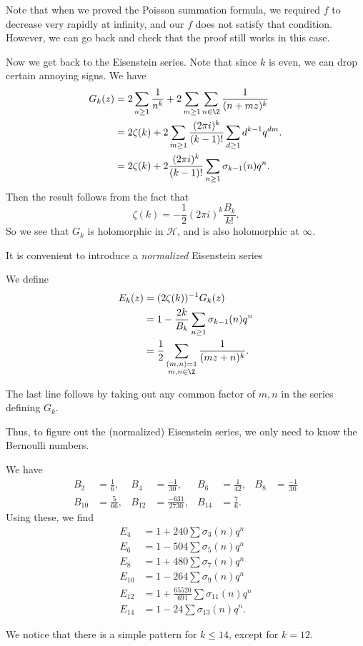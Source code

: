 \documentclass[a4paper]{article}
\renewcommand{\H}{\mathcal{H}}
\begin{document}
Note that when we proved the Poisson summation formula, we required $f$ to decrease very rapidly at infinity, and our $f$ does not satisfy that condition. However, we can go back and check that the proof still works in this case.

Now we get back to the Eisenstein series. Note that since $k$ is even, we can drop certain annoying signs. We have
\begin{align*}
  G_k(z) &= 2 \sum_{n \geq 1} \frac{1}{n^k} + 2 \sum_{m \geq 1} \sum_{n \in \Z} \frac{1}{(n + mz)^k}\\
  &= 2 \zeta(k) + 2 \sum_{m \geq 1} \frac{(2\pi i )^k}{(k - 1)!} \sum_{d \geq 1} d^{k - 1} q^{dm}.\\
  &= 2 \zeta(k) + 2 \frac{(2\pi i)^k}{(k - 1)!} \sum_{n \geq 1} \sigma_{k - 1}(n) q^n.
\end{align*}
Then the result follows from the fact that
\[
  \zeta(k) = -\frac{1}{2} (2\pi i)^k \frac{B_k}{k!}.
\]
So we see that $G_k$ is holomorphic in $\H$, and is also holomorphic at $\infty$.

It is convenient to introduce a \emph{normalized} Eisenstein series
\begin{defi}
  We define
  \begin{align*}
    E_k(z) &= (2 \zeta(k))^{-1} G_k(z) \\
    &= 1 - \frac{2k}{B_k} \sum_{n \geq 1} \sigma_{k - 1}(n) q^n\\
    &= \frac{1}{2} \sum_{\substack{(m, n) = 1\\m , n \in \Z}} \frac{1}{(mz + n)^k}.
  \end{align*}
\end{defi}
The last line follows by taking out any common factor of $m, n$ in the series defining $G_k$.

Thus, to figure out the (normalized) Eisenstein series, we only need to know the Bernoulli numbers.
\begin{eg}
  We have
  \begin{align*}
    B_2 &= \frac{1}{6}, & B_4 &= \frac{-1}{30}, & B_6 &= \frac{1}{42}, & B_8 &= \frac{-1}{30}\\
    B_{10} &= \frac{5}{66}, & B_{12} &= \frac{-631}{2730}, & B_{14} &= \frac{7}{6}.
  \end{align*}
  Using these, we find
  \begin{align*}
    E_4 &= 1 + 240 \sum \sigma_3(n) q^n\\
    E_6 &= 1 - 504 \sum \sigma_5 (n) q^n\\
    E_8 &= 1 + 480 \sum \sigma_7(n) q^n\\
    E_{10} &= 1 - 264 \sum \sigma_9(n) q^n\\
    E_{12} &= 1 + \frac{65520}{691} \sum \sigma_{11}(n) q^n\\
    E_{14} &= 1 - 24 \sum \sigma_{13}(n) q^n.
  \end{align*}
\end{eg}
We notice that there is a simple pattern for $k \leq 14$, except for $k = 12$.
\end{document}
